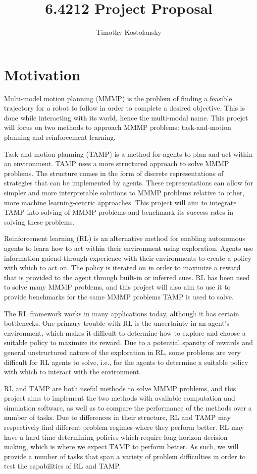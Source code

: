 \documentclass[12pt, letterpaper]{article}
\title{6.4212 Project Proposal}
\author{Timothy Kostolansky}
\date{}
\begin{document}
\maketitle

\section*{Motivation}
Multi-model motion planning (MMMP) is the problem of finding a feasible trajectory for a robot to follow in order to complete a desired objective. This is done while interacting with its world, hence the multi-modal name. This proejct will focus on two methods to approach MMMP problems: task-and-motion planning and reinforcement learning.

Task-and-motion planning (TAMP) is a method for agents to plan and act within an environment. TAMP uses a more structured approach to solve MMMP problems. The structure comes in the form of discrete representations of strategies that can be implemented by agents. These representations can allow for simpler and more interpretable solutions to MMMP problems relative to other, more machine learning-centric approaches. This project will aim to integrate TAMP into solving of MMMP problems and benchmark its success rates in solving these problems.

Reinforcement learning (RL) is an alternative method for enabling autonomous agents to learn how to act within their environment using exploration. Agents use information gaiend through experience with their environments to create a policy with which to act on. The policy is iterated on in order to maximize a reward that is provided to the agent through built-in or inferred cues. RL has been used to solve many MMMP problems, and this project will also aim to use it to provide benchmarks for the same MMMP problems TAMP is used to solve.

The RL framework works in many applications today, although it has certain bottlenecks. One primary trouble with RL is the uncertainty in an agent's environment, which makes it difficult to determine how to explore and choose a suitable policy to maximize its reward. Due to a potential sparsity of rewards and general unstructured nature of the exploration in RL, some problems are very difficult for RL agents to solve, i.e., for the agents to determine a suitable policy with which to interact with the environment.


RL and TAMP are both useful methods to solve MMMP problems, and this project aims to implement the two methods with available computation and simulation software, as well as to compare the performance of the methods over a number of tasks. Due to differences in their structure, RL and TAMP may respectively find different problem regimes where they perform better. RL may have a hard time determining policies which require long-horizon decision-making, which is where we expect TAMP to perform better. As such, we will provide a number of tasks that span a variety of problem difficulties in order to test the capabilities of RL and TAMP.
\end{document}
